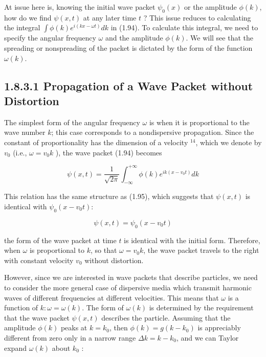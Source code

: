 \documentclass[10pt]{article}
\begin{document}
At issue here is, knowing the initial wave packet $\psi_{0}(x)$ or the amplitude $\phi(k)$, how do we find $\psi(x, t)$ at any later time $t$ ? This issue reduces to calculating the integral $\int \phi(k) e^{i(k x-\omega t)} d k$ in (1.94). To calculate this integral, we need to specify the angular frequency $\omega$ and the amplitude $\phi(k)$. We will see that the spreading or nonspreading of the packet is dictated by the form of the function $\omega(k)$.

\subsection*{1.8.3.1 Propagation of a Wave Packet without Distortion}
The simplest form of the angular frequency $\omega$ is when it is proportional to the wave number $k$; this case corresponds to a nondispersive propagation. Since the constant of proportionality has the dimension of a velocity ${ }^{14}$, which we denote by $v_{0}$ (i.e., $\omega=v_{0} k$ ), the wave packet (1.94) becomes


\begin{equation*}
\psi(x, t)=\frac{1}{\sqrt{2 \pi}} \int_{-\infty}^{+\infty} \phi(k) e^{i k\left(x-v_{0} t\right)} d k \tag{1.115}
\end{equation*}


This relation has the same structure as (1.95), which suggests that $\psi(x, t)$ is identical with $\psi_{0}\left(x-v_{0} t\right):$


\begin{equation*}
\psi(x, t)=\psi_{0}\left(x-v_{0} t\right) \tag{1.116}
\end{equation*}


the form of the wave packet at time $t$ is identical with the initial form. Therefore, when $\omega$ is proportional to $k$, so that $\omega=v_{0} k$, the wave packet travels to the right with constant velocity $v_{0}$ without distortion.

However, since we are interested in wave packets that describe particles, we need to consider the more general case of dispersive media which transmit harmonic waves of different frequencies at different velocities. This means that $\omega$ is a function of $k: \omega=\omega(k)$. The form of $\omega(k)$ is determined by the requirement that the wave packet $\psi(x, t)$ describes the particle. Assuming that the amplitude $\phi(k)$ peaks at $k=k_{0}$, then $\phi(k)=g\left(k-k_{0}\right)$ is appreciably different from zero only in a narrow range $\Delta k=k-k_{0}$, and we can Taylor expand $\omega(k)$ about $k_{0}$ :
\end{document}
